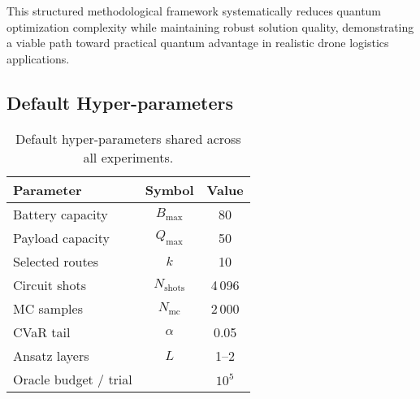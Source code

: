 This structured methodological framework systematically reduces quantum optimization complexity while maintaining robust solution quality, demonstrating a viable path toward practical quantum advantage in realistic drone logistics applications.


\subsection{Default Hyper-parameters}

\begin{table}[H]
\centering
\begin{tabular}{lcc}
\toprule
Parameter & Symbol & Value \\
\midrule
Battery capacity & $B_{\max}$ & 80 \\
Payload capacity & $Q_{\max}$ & 50 \\
Selected routes & $k$ & 10 \\
Circuit shots & $N_{\text{shots}}$ & 4\,096 \\
MC samples & $N_{\text{mc}}$ & 2\,000 \\
CVaR tail & $\alpha$ & 0.05 \\
Ansatz layers & $L$ & 1–2 \\
Oracle budget / trial &  & $10^{5}$ \\
\bottomrule
\end{tabular}
\caption{Default hyper-parameters shared across all experiments.}
\end{table}